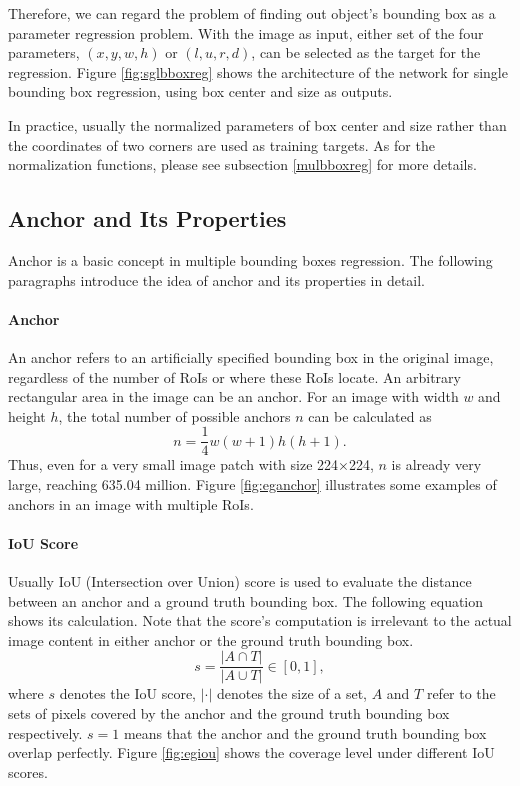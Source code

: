 Therefore, we can regard the problem of finding out object's bounding box as a parameter regression problem. With the image as input, either set of the four parameters, $(x, y, w, h)$ or $(l, u, r, d)$, can be selected as the target for the regression. Figure \ref{fig:sglbboxreg} shows the architecture of the network for single bounding box regression, using box center and size as outputs.



In practice, usually the normalized parameters of box center and size rather than the coordinates of two corners are used as training targets. As for the normalization functions, please see subsection \ref{mulbboxreg} for more details.

\subsection{Anchor and Its Properties}\label{ancpro}
Anchor is a basic concept in multiple bounding boxes regression. The following paragraphs introduce the idea of anchor and its properties in detail.

\paragraph{Anchor}
An anchor refers to an artificially specified bounding box in the original image, regardless of the number of RoIs or where these RoIs locate. An arbitrary rectangular area in the image can be an anchor. For an image with width $w$ and height $h$, the total number of possible anchors $n$ can be calculated as
\begin{equation}\label{eq:numanchor}
	n = \frac{1}{4}w(w+1)h(h+1).
\end{equation}
Thus, even for a very small image patch with size 224$\times$224, $n$ is already very large, reaching 635.04 million. Figure \ref{fig:eganchor} illustrates some examples of anchors in an image with multiple RoIs.



\paragraph{IoU Score}
Usually IoU (Intersection over Union) score is used to evaluate the distance between an anchor and a ground truth bounding box. The following equation shows its calculation. Note that the score's computation is irrelevant to the actual image content in either anchor or the ground truth bounding box.
\begin{equation}
	s = \frac{\lvert A \cap T \rvert}{\lvert A \cup T \rvert} \in [0, 1],
\end{equation}
where $s$ denotes the IoU score, $\lvert \cdot \rvert$ denotes the size of a set, $A$ and $T$ refer to the sets of pixels covered by the anchor and the ground truth bounding box respectively. $s = 1$ means that the anchor and the ground truth bounding box overlap perfectly. Figure \ref{fig:egiou} shows the coverage level under different IoU scores.


